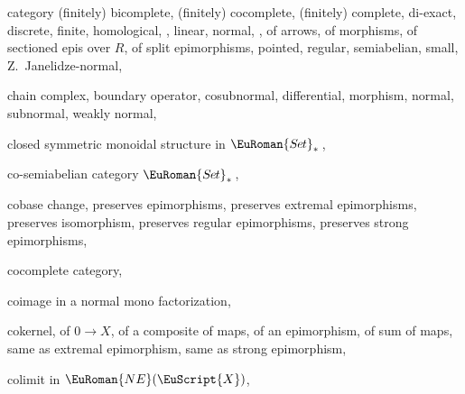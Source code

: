 \documentclass [12pt,oneside]{book}%
\theoremstyle{captionstyle}  %
\newcommand{\SetsBsd}{\EuRoman{S{\kern-0.12ex}e{\hskip-0.14ex}t}_{\ast}\,}	%
\newcommand{\ZeroObject}{0}                           %
\newcommand{\Ctgry}[1]{\EuScript{#1}}					%
\newcommand{\NEpiCat}[1]{\EuRoman{NE}(\Ctgry{#1})}				%
\begin{document}
\begin{theindex}
    \indexspace

    \item category
    \subitem (finitely) bicomplete, 
    \subitem (finitely) cocomplete, 
    \subitem (finitely) complete, 
    \subitem di-exact, 
    \subitem discrete, 
    \subitem finite, 
    \subitem homological, , 
    \subitem linear, 
    \subitem normal, , 
    \subitem of arrows, 
    \subitem of morphisms, 
    \subitem of sectioned epis over $R$, 
    \subitem of split epimorphisms, 
    \subitem pointed, 
    \subitem regular, 
    \subitem semiabelian, 
    \subitem small, 
    \subitem Z.~Janelidze-normal, 
    \item chain complex, 
    \subitem boundary operator, 
    \subitem cosubnormal, 
    \subitem differential, 
    \subitem morphism, 
    \subitem normal, 
    \subitem subnormal, 
    \subitem weakly normal, 
    \item closed symmetric monoidal
    \subitem structure in $\SetsBsd $, 
    \item co-semiabelian category
    \subitem $\SetsBsd $, 
    \item cobase change, 
    \subitem preserves epimorphisms, 
    \subitem preserves extremal epimorphisms, 
    \subitem preserves isomorphism, 
    \subitem preserves regular epimorphisms, 
    \subitem preserves strong epimorphisms, 
    \item cocomplete category, 
    \item coimage
    \subitem in a normal mono factorization, 
    \item cokernel, 
    \subitem of $\ZeroObject \to X$, 
    \subitem of a composite of maps, 
    \subitem of an epimorphism, 
    \subitem of sum of maps, 
    \subitem same as extremal epimorphism, 
    \subitem same as strong epimorphism, 
    \item colimit
    \subitem in $\NEpiCat {X}$, 

\end{theindex}
\end{document}
